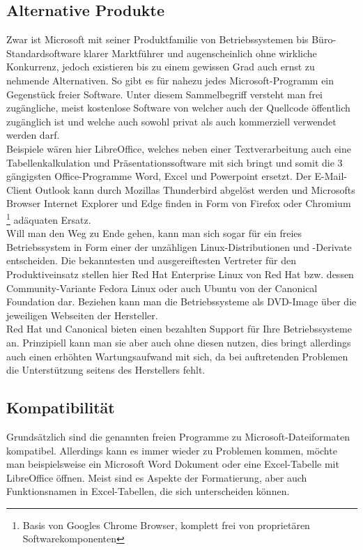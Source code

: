 \subsection{Alternative Produkte}
Zwar ist Microsoft mit seiner Produktfamilie von Betriebssystemen bis Büro-Standardsoftware klarer Marktführer und augenscheinlich ohne wirkliche Konkurrenz, jedoch existieren bis zu einem gewissen Grad auch ernst zu nehmende Alternativen. So gibt es für nahezu jedes Microsoft-Programm ein Gegenstück freier Software. Unter diesem Sammelbegriff versteht man frei zugängliche, meist kostenlose Software von welcher auch der Quellcode öffentlich zugänglich ist und welche auch sowohl privat als auch kommerziell verwendet werden darf.\\
Beispiele wären hier \glqq LibreOffice\grqq{}, welches neben einer Textverarbeitung auch eine Tabellenkalkulation und Präsentationssoftware mit sich bringt und somit die 3 gängigsten Office-Programme \glqq Word\grqq{}, \glqq Excel\grqq{} und \glqq Powerpoint \grqq{} ersetzt. Der E-Mail-Client \glqq Outlook\grqq{} kann durch Mozillas \glqq Thunderbird\grqq{} abgelöst werden und Microsofts Browser \glqq Internet Explorer\grqq{} und \glqq Edge\grqq{} finden in Form von \glqq Firefox\grqq{} oder \glqq Chromium\grqq{} \footnote{Basis von Googles Chrome Browser, komplett frei von proprietären Softwarekomponenten} adäquaten Ersatz.\\
Will man den Weg zu Ende gehen, kann man sich sogar für ein freies Betriebssystem in Form einer der unzähligen Linux-Distributionen und -Derivate entscheiden. Die bekanntesten und ausgereiftesten Vertreter für den Produktiveinsatz stellen hier \glqq Red Hat Enterprise Linux\grqq{} von Red Hat bzw. dessen Community-Variante \glqq Fedora Linux\grqq{} oder auch \glqq Ubuntu\grqq{} von der Canonical Foundation dar. Beziehen kann man die Betriebssysteme als DVD-Image über die jeweiligen Webseiten der Hersteller.\\
Red Hat und Canonical bieten einen bezahlten Support für Ihre Betriebssysteme an. Prinzipiell kann man sie aber auch ohne diesen nutzen, dies bringt allerdings auch einen erhöhten Wartungsaufwand mit sich, da bei auftretenden Problemen die Unterstützung seitens des Herstellers fehlt.

\subsection{Kompatibilität}
Grundsätzlich sind die genannten freien Programme zu Microsoft-Dateiformaten kompatibel. Allerdings kann es immer wieder zu Problemen kommen, möchte man beispielsweise ein Microsoft Word Dokument oder eine Excel-Tabelle mit LibreOffice öffnen. Meist sind es Aspekte der Formatierung, aber auch Funktionsnamen in Excel-Tabellen, die sich unterscheiden können.

